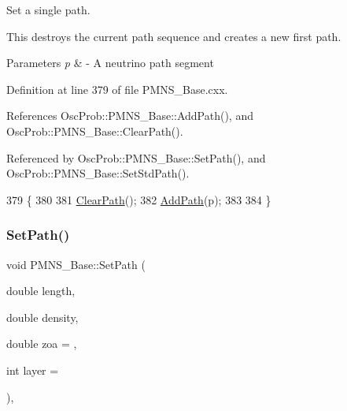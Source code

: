 Set a single path.

This destroys the current path sequence and creates a new first path.


\begin{DoxyParams}{Parameters}
{\em p} & -\/ A neutrino path segment \\
\hline
\end{DoxyParams}


Definition at line 379 of file P\+M\+N\+S\+\_\+\+Base.\+cxx.



References Osc\+Prob\+::\+P\+M\+N\+S\+\_\+\+Base\+::\+Add\+Path(), and Osc\+Prob\+::\+P\+M\+N\+S\+\_\+\+Base\+::\+Clear\+Path().



Referenced by Osc\+Prob\+::\+P\+M\+N\+S\+\_\+\+Base\+::\+Set\+Path(), and Osc\+Prob\+::\+P\+M\+N\+S\+\_\+\+Base\+::\+Set\+Std\+Path().


\begin{DoxyCode}
379                                \{
380 
381   \hyperlink{classOscProb_1_1PMNS__Base_aefe521239031c418cfaaaa550a6e13bb}{ClearPath}();
382   \hyperlink{classOscProb_1_1PMNS__Base_a887dc9d4dc569ec0cdef3933b4c60efc}{AddPath}(p);
383 
384 \}
\end{DoxyCode}
\mbox{\label{classOscProb_1_1PMNS__Base_a35b983270613072a3df58b574d80dbfd}} 
\subsubsection{\texorpdfstring{Set\+Path()}{SetPath()}\hspace{0.1cm}{\footnotesize\ttfamily [2/3]}}
{\footnotesize\ttfamily void P\+M\+N\+S\+\_\+\+Base\+::\+Set\+Path (\begin{DoxyParamCaption}\item[{double}]{length,  }\item[{double}]{density,  }\item[{double}]{zoa = {},  }\item[{int}]{layer = {} }\end{DoxyParamCaption})\hspace{0.3cm}{\ttfamily [virtual]}, {\ttfamily [inherited]}}

